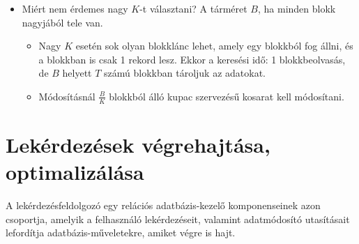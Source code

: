 \documentclass[12pt,margin=0px]{article}
\newcommand\ddfrac[2]{\frac{\displaystyle #1}{\displaystyle #2}}
\begin{document}
\begin{itemize}
    	\item Miért nem érdemes nagy $K$-t választani?
       	   A tárméret $B$, ha minden blokk nagyjából tele van.
            \begin{itemize}
               \item Nagy $K$ esetén sok olyan blokklánc lehet, amely egy blokkból fog állni, és a blokkban is csak 1 rekord lesz. Ekkor a keresési idő: 1 blokkbeolvasás,
        	de $B$ helyett $T$ számú blokkban tároljuk az adatokat.
            \item Módosításnál $\ddfrac{B}{K}$ blokkból álló kupac szervezésű kosarat kell módosítani.
            \end{itemize}
	\end{itemize}

	\section*{Lekérdezések végrehajtása, optimalizálása}
	
	A lekérdezésfeldolgozó egy relációs adatbázis-kezelő komponenseinek azon csoportja, amelyik a felhasználó lekérdezéseit, valamint adatmódosító utasításait lefordítja adatbázis-műveletekre, amiket végre is hajt.
	
\end{document}
